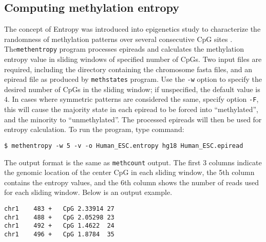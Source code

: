 \documentclass[10pt]{article}
\newcommand{\prog}[1]{\texttt{#1}}
\newcommand{\op}[1]{\texttt{#1}}
\begin{document}







\subsection{Computing methylation entropy}
\label{sec:methentropy}
The concept of Entropy was introduced into epigenetics study to
characterize the randomness of methylation patterns over several
consecutive CpG sites \cite{xie2011}. The\prog{methentropy} program
processes epireads and calculates the methylation entropy value in
sliding windows of specified number of CpGs. Two input files are
required, including the directory containing the chromosome fasta
files, and an epiread file as produced by \prog{methstates}
program. Use the \op{-w} option to specify the desired number of CpGs
in the sliding window; if unspecified, the default value is $4$. In
cases where symmetric patterns are considered the same, specify option
\op{-F}, this will cause the majority state in each epiread to be
forced into ``methylated'', and the minority to ``unmethylated''. The
processed epireads will then be used for entropy calculation. To run
the program, type command:
\begin{verbatim}
$ methentropy -w 5 -v -o Human_ESC.entropy hg18 Human_ESC.epiread
\end{verbatim} 
The output format is the same as \prog{methcount} output. The first 3
columns indicate the genomic location of the center CpG in each
sliding window, the 5th column contains the entropy values, and the
6th column shows the number of reads used for each sliding
window. Below is an output example.
\begin{verbatim}
chr1	483	+	CpG	2.33914	27
chr1	488	+	CpG	2.05298	23
chr1	492	+	CpG	1.4622	24
chr1	496	+	CpG	1.8784	35
\end{verbatim}
\end{document}
